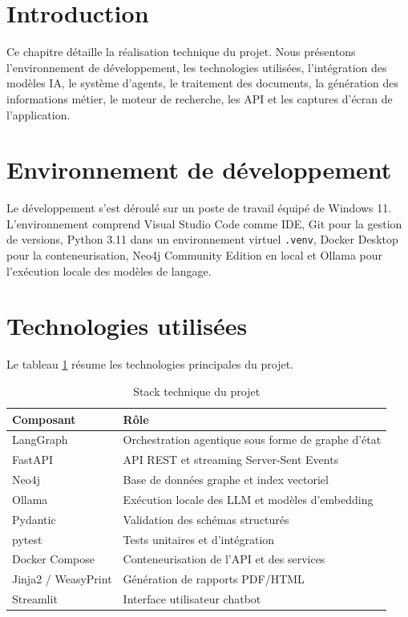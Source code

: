 \section*{Introduction}
Ce chapitre détaille la réalisation technique du projet. Nous présentons l'environnement de développement, les technologies utilisées, l'intégration des modèles IA, le système d'agents, le traitement des documents, la génération des informations métier, le moteur de recherche, les API et les captures d'écran de l'application.

\section{Environnement de développement}
Le développement s'est déroulé sur un poste de travail équipé de Windows 11. L'environnement comprend Visual Studio Code comme IDE, Git pour la gestion de versions, Python 3.11 dans un environnement virtuel \texttt{.venv}, Docker Desktop pour la conteneurisation, Neo4j Community Edition en local et Ollama pour l'exécution locale des modèles de langage.

\section{Technologies utilisées}
Le tableau \ref{tab:stack} résume les technologies principales du projet.

\begin{table}[H]
    \centering
    \renewcommand{\arraystretch}{1.2}
    \begin{tabular}{|l|p{10cm}|}
        \hline
        \rowcolor{iNavy} \textbf{\color{white}Composant} & \textbf{\color{white}Rôle} \\ \hline
        LangGraph & Orchestration agentique sous forme de graphe d'état \\ \hline
        FastAPI & API REST et streaming Server-Sent Events \\ \hline
        Neo4j & Base de données graphe et index vectoriel \\ \hline
        Ollama & Exécution locale des LLM et modèles d'embedding \\ \hline
        Pydantic & Validation des schémas structurés \\ \hline
        pytest & Tests unitaires et d'intégration \\ \hline
        Docker Compose & Conteneurisation de l'API et des services \\ \hline
        Jinja2 / WeasyPrint & Génération de rapports PDF/HTML \\ \hline
        Streamlit & Interface utilisateur chatbot \\ \hline
    \end{tabular}
    \caption{Stack technique du projet}
    \label{tab:stack}
\end{table}


